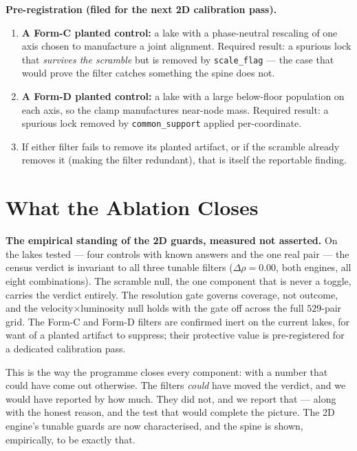 \documentclass[11pt, letterpaper, openany]{book}
\begin{document}
\begin{predictionbox}
\textbf{Pre-registration (filed for the next 2D calibration pass).}
\begin{enumerate}
    \item \textbf{A Form-C planted control:} a lake with a phase-neutral rescaling of one axis chosen to
          manufacture a joint alignment. Required result: a spurious lock that \emph{survives the
          scramble} but is removed by \texttt{scale\_flag} --- the case that would prove the filter catches
          something the spine does not.
    \item \textbf{A Form-D planted control:} a lake with a large below-floor population on each axis, so
          the clamp manufactures near-node mass. Required result: a spurious lock removed by
          \texttt{common\_support} applied per-coordinate.
    \item If either filter fails to remove its planted artifact, or if the scramble already removes it
          (making the filter redundant), that is itself the reportable finding.
\end{enumerate}
\end{predictionbox}

\section{What the Ablation Closes}

\begin{nullbox}
\textbf{The empirical standing of the 2D guards, measured not asserted.} On the lakes tested --- four
controls with known answers and the one real pair --- the census verdict is invariant to all three
tunable filters ($\Delta\rho = 0.00$, both engines, all eight combinations). The scramble null, the one
component that is never a toggle, carries the verdict entirely. The resolution gate governs coverage, not
outcome, and the velocity$\times$luminosity null holds with the gate off across the full $529$-pair grid.
The Form-C and Form-D filters are confirmed inert on the current lakes, for want of a planted artifact to
suppress; their protective value is pre-registered for a dedicated calibration pass.
\end{nullbox}

This is the way the programme closes every component: with a number that could have come out otherwise.
The filters \emph{could} have moved the verdict, and we would have reported by how much. They did not, and
we report that --- along with the honest reason, and the test that would complete the picture. The 2D
engine's tunable guards are now characterised, and the spine is shown, empirically, to be exactly that.
\end{document}
